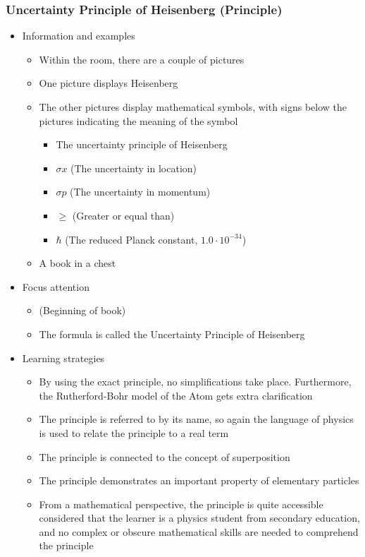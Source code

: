 \documentclass[11pt,twoside]{report} %
\begin{document}
\subsubsection{Uncertainty Principle of Heisenberg (Principle)}
	\begin{itemize}
		\item Information and examples
		\begin{itemize}
			\item Within the room, there are a couple of pictures
			\item One picture displays Heisenberg
			\item The other pictures display mathematical symbols, with signs below the pictures indicating the meaning of the symbol
			\begin{itemize}
				\item The uncertainty principle of Heisenberg
				\item $\sigma x$ (The uncertainty in location)
				\item $\sigma p$ (The uncertainty in momentum)
				\item $\geq$ (Greater or equal than)
				\item $\hbar$ (The reduced Planck constant, $1.0 \cdot 10^{-34}$)
			\end{itemize}
			\item A book in a chest
		\end{itemize}
		\item Focus attention
		\begin{itemize}
			\item (Beginning of book)
			\item The formula is called the Uncertainty Principle of Heisenberg
		\end{itemize}
		\item Learning strategies
		\begin{itemize}
			\item By using the exact principle, no simplifications take place. Furthermore, the Rutherford-Bohr model of the Atom gets extra clarification
			\item The principle is referred to by its name, so again the language of physics is used to relate the principle to a real term
			\item The principle is connected to the concept of superposition
			\item The principle demonstrates an important property of elementary particles
			\item From a mathematical perspective, the principle is quite accessible considered that the learner is a physics student from secondary education, and no complex or obscure mathematical skills are needed to comprehend the principle

\end{itemize}
\end{itemize}
\end{document}
